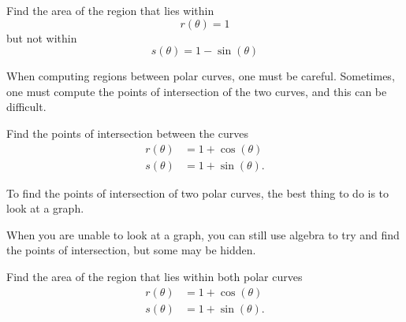 \documentclass{ximera}
\begin{document}
\begin{example}
  Find the area of the region that lies within
  \[
  r(\theta) = 1
  \]
  but not within
  \[
  s(\theta) = 1-\sin(\theta)
  \]
\end{example}


When computing regions between polar curves, one must be
careful. Sometimes, one must compute the points of intersection of the
two curves, and this can be difficult.
\begin{example}
  Find the points of intersection between the curves
  \begin{align*}
    r(\theta) &= 1+ \cos(\theta)\\
    s(\theta) &= 1+ \sin(\theta).
  \end{align*}
  \begin{explanation}
    To find the points of intersection of two polar curves, the best
    thing to do is to look at a graph.


    When you are unable to look at a graph, you can still use algebra
    to try and find the points of intersection, but some may be
    hidden.
  \end{explanation}
\end{example}


\begin{example}
  Find the area of the region that lies within both polar curves
  \begin{align*}
    r(\theta) &= 1+ \cos(\theta)\\
    s(\theta) &= 1+ \sin(\theta).
  \end{align*}
\end{example}

\end{document}
